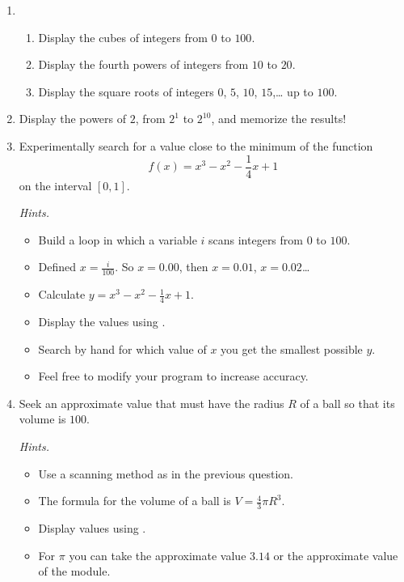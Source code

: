\documentclass[11pt,class=report,crop=false]{standalone}
\begin{document}
\begin{activite}


\begin{enumerate}
  \item 
  \begin{enumerate}
    \item Display the cubes of integers from $0$ to $100$.
    \item Display the fourth powers of integers from $10$ to $20$.
    \item Display the square roots of integers $0$, $5$, $10$, $15$,\ldots{} up to $100$.   
  \end{enumerate}

  \item Display the powers of $2$, from $2^1$ to $2^{10}$, and memorize the results!
  
  
  \item Experimentally search for a value close to the minimum of the function 
  $$f(x) = x^3-x^2-\frac14x+1$$
   on the interval $[0,1]$.
  
  \emph{Hints.}
  \begin{itemize}
    \item Build a loop in which a variable $i$ scans integers from $0$ to $100$.
    \item Defined $x=\frac{i}{100}$. So $x=0.00$, then $x=0.01$, $x=0.02$\ldots
    \item Calculate $y = x^3-x^2-\frac14x+1$.
    \item Display the values using .
    \item Search by hand for which value of $x$ you get the smallest possible $y$.
    \item Feel free to modify your program to increase accuracy.
  \end{itemize}
    
  \item Seek an approximate value that must have
  the radius $R$ of a ball so that its volume is $100$.
  
  \emph{Hints.} 
  \begin{itemize}
    \item Use a scanning method as in the previous question.
    \item The formula for the volume of a ball is $V = \frac43 \pi R^3$.
    \item Display values using .    
    \item For $\pi$ you can take the approximate value $3.14$ or the approximate value  of the  module.
  \end{itemize}
  
\end{enumerate}  
\end{activite}
\end{document}
